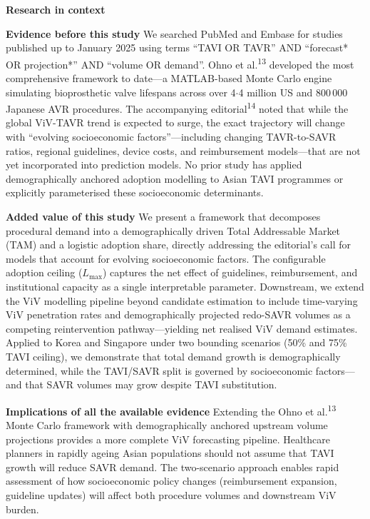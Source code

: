 \documentclass[10pt, a4paper]{article}
\begin{document}
\begin{lancetpanel}
{\large\bfseries\color{lancetred} Research in context}
\vspace{6pt}

\small

\textbf{Evidence before this study}\quad
We searched PubMed and Embase for studies published up to January 2025 using terms ``TAVI OR TAVR'' AND ``forecast* OR projection*'' AND ``volume OR demand''. Ohno et al.\textsuperscript{13} developed the most comprehensive framework to date---a MATLAB-based Monte Carlo engine simulating bioprosthetic valve lifespans across over 4$\cdot$4 million US and 800\,000 Japanese AVR procedures. The accompanying editorial\textsuperscript{14} noted that while the global ViV-TAVR trend is expected to surge, the exact trajectory will change with ``evolving socioeconomic factors''---including changing TAVR-to-SAVR ratios, regional guidelines, device costs, and reimbursement models---that are not yet incorporated into prediction models. No prior study has applied demographically anchored adoption modelling to Asian TAVI programmes or explicitly parameterised these socioeconomic determinants.

\vspace{4pt}
\textbf{Added value of this study}\quad
We present a framework that decomposes procedural demand into a demographically driven Total Addressable Market (TAM) and a logistic adoption share, directly addressing the editorial's call for models that account for evolving socioeconomic factors. The configurable adoption ceiling ($L_{\max}$) captures the net effect of guidelines, reimbursement, and institutional capacity as a single interpretable parameter. Downstream, we extend the ViV modelling pipeline beyond candidate estimation to include time-varying ViV penetration rates and demographically projected redo-SAVR volumes as a competing reintervention pathway---yielding net realised ViV demand estimates. Applied to Korea and Singapore under two bounding scenarios (50\% and 75\% TAVI ceiling), we demonstrate that total demand growth is demographically determined, while the TAVI/SAVR split is governed by socioeconomic factors---and that SAVR volumes may grow despite TAVI substitution.

\vspace{4pt}
\textbf{Implications of all the available evidence}\quad
Extending the Ohno et al.\textsuperscript{13} Monte Carlo framework with demographically anchored upstream volume projections provides a more complete ViV forecasting pipeline. Healthcare planners in rapidly ageing Asian populations should not assume that TAVI growth will reduce SAVR demand. The two-scenario approach enables rapid assessment of how socioeconomic policy changes (reimbursement expansion, guideline updates) will affect both procedure volumes and downstream ViV burden.
\end{lancetpanel}
\end{document}
